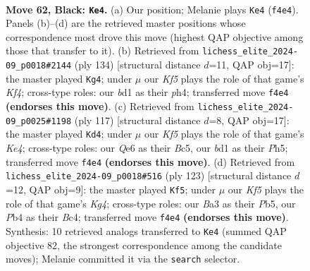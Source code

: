 \documentclass[11pt]{article}
\begin{document}
\clearpage

\begin{figure}[p]\centering
\begin{subfigure}{0.46\textwidth}\centering
\resizebox{\linewidth}{!}{%
\newchessgame
\chessboard[
  setfen={8/8/4q3/R7/1p3k2/b7/6K1/3B4 b - - 15 62},
  showmover=false,
  pgfstyle=straightmove, color=movearrow, markmove={f4-e4}
]}
\caption{}
\end{subfigure}\hfill
\begin{subfigure}{0.46\textwidth}\centering
\resizebox{\linewidth}{!}{%
\newchessgame
\chessboard[
  setfen={8/2k5/8/3B4/4PK1p/8/3r4/8 w - - 0 68},
  showmover=false,
  pgfstyle=straightmove, color=movearrow, markmove={f4-g4}
]}
\caption{}
\end{subfigure}
\\[4pt]
\begin{subfigure}{0.46\textwidth}\centering
\resizebox{\linewidth}{!}{%
\newchessgame
\chessboard[
  setfen={8/8/8/1pb1k2p/2b5/8/6K1/2R5 b - - 7 59},
  showmover=false,
  pgfstyle=straightmove, color=movearrow, markmove={e5-d4}
]}
\caption{}
\end{subfigure}\hfill
\begin{subfigure}{0.46\textwidth}\centering
\resizebox{\linewidth}{!}{%
\newchessgame
\chessboard[
  setfen={8/8/1R6/1p4k1/2bK4/8/8/8 b - - 1 62},
  showmover=false,
  pgfstyle=straightmove, color=movearrow, markmove={g5-f5}
]}
\caption{}
\end{subfigure}
\caption{\textbf{Move 62, Black: \texttt{Ke4}.} (a) Our position; Melanie plays \texttt{Ke4} (\texttt{f4e4}). Panels (b)--(d) are the retrieved master positions whose correspondence most drove this move (highest QAP objective among those that transfer to it). (b) Retrieved from \texttt{lichess\_elite\_2024-09\_p0018\#2144} (ply 134) [structural distance $d$=11, QAP obj=17]: the master played \texttt{Kg4}; under $\mu$ our \emph{Kf5} plays the role of that game's \emph{Kf4}; cross-type roles: our \emph{b}d1 as their \emph{p}h4; transferred move \texttt{f4e4} \textbf{(endorses this move)}. (c) Retrieved from \texttt{lichess\_elite\_2024-09\_p0025\#1198} (ply 117) [structural distance $d$=8, QAP obj=17]: the master played \texttt{Kd4}; under $\mu$ our \emph{Kf5} plays the role of that game's \emph{Ke4}; cross-type roles: our \emph{Q}e6 as their \emph{B}c5, our \emph{b}d1 as their \emph{P}h5; transferred move \texttt{f4e4} \textbf{(endorses this move)}. (d) Retrieved from \texttt{lichess\_elite\_2024-09\_p0018\#516} (ply 123) [structural distance $d$=12, QAP obj=9]: the master played \texttt{Kf5}; under $\mu$ our \emph{Kf5} plays the role of that game's \emph{Kg4}; cross-type roles: our \emph{B}a3 as their \emph{P}b5, our \emph{P}b4 as their \emph{B}c4; transferred move \texttt{f4e4} \textbf{(endorses this move)}. Synthesis: 10 retrieved analogs transferred to \texttt{Ke4} (summed QAP objective 82, the strongest correspondence among the candidate moves); Melanie committed it via the \texttt{search} selector.}
\label{fig:thought-m123}
\end{figure}
\end{document}
